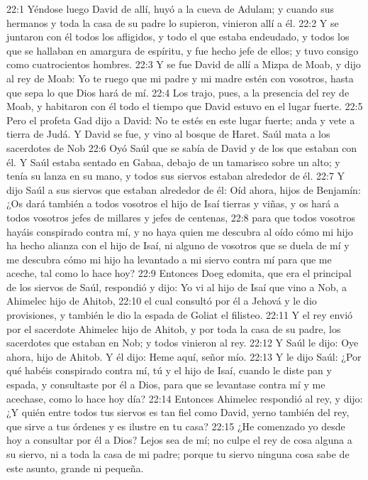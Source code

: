 22:1 Yéndose luego David de allí, huyó a la cueva de Adulam; y cuando sus hermanos y toda la casa de su padre lo supieron, vinieron allí a él.  
22:2 Y se juntaron con él todos los afligidos, y todo el que estaba endeudado, y todos los que se hallaban en amargura de espíritu, y fue hecho jefe de ellos; y tuvo consigo como cuatrocientos hombres.  
22:3 Y se fue David de allí a Mizpa de Moab, y dijo al rey de Moab: Yo te ruego que mi padre y mi madre estén con vosotros, hasta que sepa lo que Dios hará de mí.  
22:4 Los trajo, pues, a la presencia del rey de Moab, y habitaron con él todo el tiempo que David estuvo en el lugar fuerte.  
22:5 Pero el profeta Gad dijo a David: No te estés en este lugar fuerte; anda y vete a tierra de Judá. Y David se fue, y vino al bosque de Haret.  
Saúl mata a los sacerdotes de Nob  
22:6 Oyó Saúl que se sabía de David y de los que estaban con él. Y Saúl estaba sentado en Gabaa, debajo de un tamarisco sobre un alto; y tenía su lanza en su mano, y todos sus siervos estaban alrededor de él.  
22:7 Y dijo Saúl a sus siervos que estaban alrededor de él: Oíd ahora, hijos de Benjamín: ¿Os dará también a todos vosotros el hijo de Isaí tierras y viñas, y os hará a todos vosotros jefes de millares y jefes de centenas,  
22:8 para que todos vosotros hayáis conspirado contra mí, y no haya quien me descubra al oído cómo mi hijo ha hecho alianza con el hijo de Isaí, ni alguno de vosotros que se duela de mí y me descubra cómo mi hijo ha levantado a mi siervo contra mí para que me aceche, tal como lo hace hoy?  
22:9 Entonces Doeg edomita, que era el principal de los siervos de Saúl, respondió y dijo: Yo vi al hijo de Isaí que vino a Nob, a Ahimelec hijo de Ahitob,  
22:10 el cual consultó por él a Jehová y le dio provisiones, y también le dio la espada de Goliat el filisteo. 
22:11 Y el rey envió por el sacerdote Ahimelec hijo de Ahitob, y por toda la casa de su padre, los sacerdotes que estaban en Nob; y todos vinieron al rey.  
22:12 Y Saúl le dijo: Oye ahora, hijo de Ahitob. Y él dijo: Heme aquí, señor mío.  
22:13 Y le dijo Saúl: ¿Por qué habéis conspirado contra mí, tú y el hijo de Isaí, cuando le diste pan y espada, y consultaste por él a Dios, para que se levantase contra mí y me acechase, como lo hace hoy día?  
22:14 Entonces Ahimelec respondió al rey, y dijo: ¿Y quién entre todos tus siervos es tan fiel como David, yerno también del rey, que sirve a tus órdenes y es ilustre en tu casa?  
22:15 ¿He comenzado yo desde hoy a consultar por él a Dios? Lejos sea de mí; no culpe el rey de cosa alguna a su siervo, ni a toda la casa de mi padre; porque tu siervo ninguna cosa sabe de este asunto, grande ni pequeña.  
